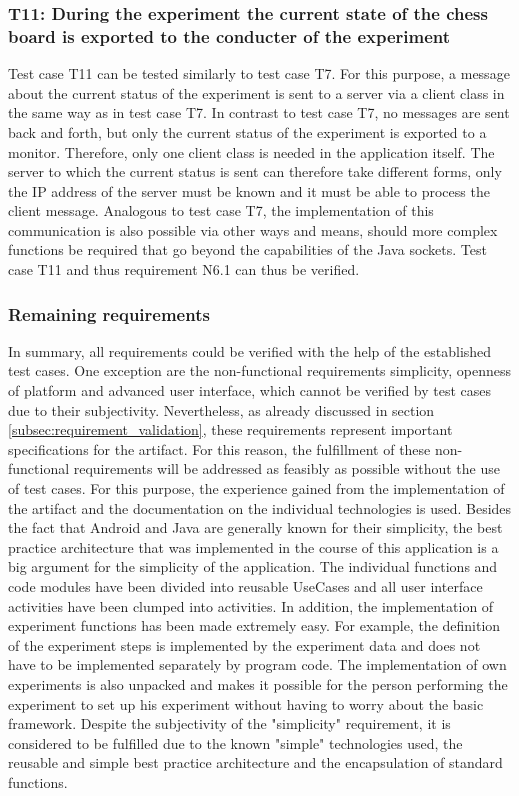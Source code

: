 \newpage\subsubsection*{T11: During the experiment the current state of the chess board is exported to the conducter of the experiment}

Test case T11 can be tested similarly to test case T7. For this purpose, a message about the current status of the experiment is sent to a server via a client class in the same way as in test case T7. In contrast to test case T7, no messages are sent back and forth, but only the current status of the experiment is exported to a monitor. Therefore, only one client class is needed in the application itself. The server to which the current status is sent can therefore take different forms, only the IP address of the server must be known and it must be able to process the client message. Analogous to test case T7, the implementation of this communication is also possible via other ways and means, should more complex functions be required that go beyond the capabilities of the Java sockets. Test case T11 and thus requirement N6.1 can thus be verified.


\subsubsection*{Remaining requirements}

In summary, all requirements could be verified with the help of the established test cases. One exception are the non-functional requirements simplicity, openness of platform and advanced user interface, which cannot be verified by test cases due to their subjectivity. Nevertheless, as already discussed in section \ref{subsec:requirement_validation}, these requirements represent important specifications for the artifact. For this reason, the fulfillment of these non-functional requirements will be addressed as feasibly as possible without the use of test cases. For this purpose, the experience gained from the implementation of the artifact and the documentation on the individual technologies is used. Besides the fact that Android and Java are generally known for their simplicity, the best practice architecture that was implemented in the course of this application is a big argument for the simplicity of the application. The individual functions and code modules have been divided into reusable UseCases and all user interface activities have been clumped into activities. In addition, the implementation of experiment functions has been made extremely easy. For example, the definition of the experiment steps is implemented by the experiment data and does not have to be implemented separately by program code. The implementation of own experiments is also unpacked and makes it possible for the person performing the experiment to set up his experiment without having to worry about the basic framework. Despite the subjectivity of the "simplicity" requirement, it is considered to be fulfilled due to the known "simple" technologies used, the reusable and simple best practice architecture and the encapsulation of standard functions.



